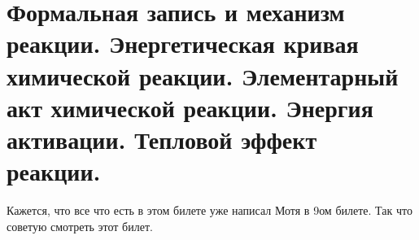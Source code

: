 \section{Формальная запись и механизм реакции. Энергетическая кривая химической реакции. Элементарный акт химической реакции. Энергия активации. Тепловой эффект реакции. }

Кажется, что все что есть в этом билете уже написал Мотя в 9ом билете. Так что советую смотреть этот билет.